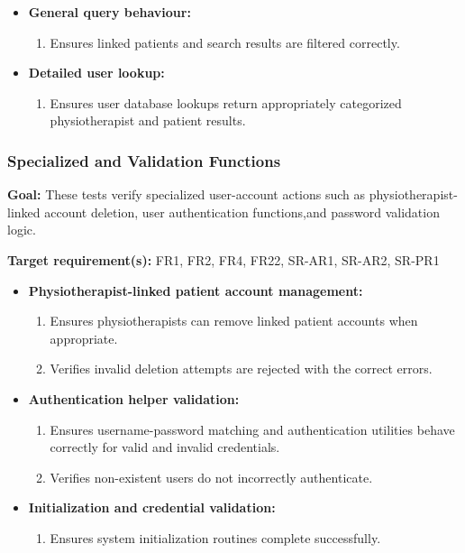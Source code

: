 \documentclass[12pt, titlepage]{article}
\begin{document}
\begin{itemize}
    \item \textbf{General query behaviour:}
    \begin{enumerate}
        \item Ensures linked patients and search results are filtered correctly.
    \end{enumerate}

    \item \textbf{Detailed user lookup:}
    \begin{enumerate}
        \item Ensures user database lookups return appropriately categorized physiotherapist and patient results.
    \end{enumerate}
\end{itemize}


\subsubsection{Specialized and Validation Functions}

\textbf{Goal:} These tests verify specialized user-account actions such as physiotherapist-linked account deletion, user authentication functions,and password validation logic.

\textbf{Target requirement(s):} FR1, FR2, FR4, FR22, SR-AR1, SR-AR2, SR-PR1

\begin{itemize}
    \item \textbf{Physiotherapist-linked patient account management:}
    \begin{enumerate}
        \item Ensures physiotherapists can remove linked patient accounts when appropriate.
        \item Verifies invalid deletion attempts are rejected with the correct errors.
    \end{enumerate}

    \item \textbf{Authentication helper validation:}
    \begin{enumerate}
        \item Ensures username-password matching and authentication utilities behave correctly for valid and invalid credentials.
        \item Verifies non-existent users do not incorrectly authenticate.
    \end{enumerate}

    \item \textbf{Initialization and credential validation:}
    \begin{enumerate}
        \item Ensures system initialization routines complete successfully.
    \end{enumerate}
\end{itemize}
\end{document}
